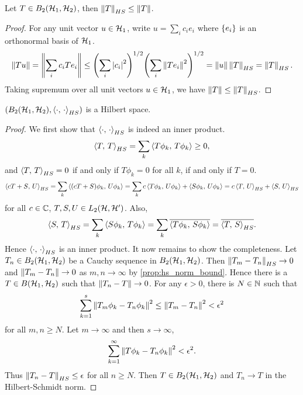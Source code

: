 \begin{proposition}\label{prop:hs_norm_bound}
    Let $T\in B_2(\mathcal{H}_1,\mathcal{H}_2)$, then $\left\lVert {T} \right\rVert_{HS}\leq\left\lVert {T} \right\rVert$. 
\end{proposition}
\begin{proof}
    For any unit vector $u\in\mathcal{H}_1$, write $u = \sum_i c_ie_i$ where 
    $\left\{ {e_i} \right\}$ is an orthonormal basis of $\mathcal{H}_1$. 
    \begin{equation*}
        \norm{Tu} = \norm{\sum_i c_iTe_i} 
        \leq \pth{\sum_i \abs{c_i}^2}^{1/2}\pth{\sum_i \norm{Te_i}^2}^{1/2} 
        = \norm{u}\norm{T}_{HS} = \norm{T}_{HS}.
    \end{equation*}
    Taking supremum over all unit vectors $u\in\mathcal{H}_1$, we have 
    $\left\lVert {T} \right\rVert\leq\left\lVert {T} \right\rVert_{HS}$.
\end{proof}

\begin{proposition}
    $(B_2(\mathcal{H}_1,\mathcal{H}_2), \left\langle {\cdot},\, {\cdot} \right\rangle_{HS})$ is a Hilbert space.
\end{proposition}
\begin{proof}
    We first show that $\left\langle {\cdot},\, {\cdot} \right\rangle_{HS}$ is indeed an inner product. 
    \begin{equation*}
        \left\langle {T},\, {T} \right\rangle_{HS} = \sum_k \left\langle {T\phi_k},\, {T\phi_k} \right\rangle \geq 0, 
    \end{equation*}
    and $\left\langle {T},\, {T} \right\rangle_{HS} = 0$ if and only if $T\phi_k = 0$ for all $k$, 
    if and only if $T = 0$. 
    \begin{equation*}
        \left\langle {cT+S},\, {U} \right\rangle_{HS} = \sum_k \left\langle {(cT+S)\phi_k},\, {U\phi_k} \right\rangle 
        = \sum_k c\left\langle {T\phi_k},\, {U\phi_k} \right\rangle + \left\langle {S\phi_k},\, {U\phi_k} \right\rangle 
        = c\left\langle {T},\, {U} \right\rangle_{HS} + \left\langle {S},\, {U} \right\rangle_{HS}
    \end{equation*}
    for all $c\in\mathbb{C}$, $T,S,U\in L_2(\mathcal{H},\mathcal{H}')$. Also, 
    \begin{equation*}
        \left\langle {S},\, {T} \right\rangle_{HS} = \sum_k \left\langle {S\phi_k},\, {T\phi_k} \right\rangle 
        = \sum_k \overline{\left\langle {T\phi_k},\, {S\phi_k} \right\rangle} 
        = \overline{\left\langle {T},\, {S} \right\rangle_{HS}}.
    \end{equation*}
    Hence $\left\langle {\cdot},\, {\cdot} \right\rangle_{HS}$ is an inner product. It now remains 
    to show the completeness. Let $T_n\in B_2(\mathcal{H}_1,\mathcal{H}_2)$ be a Cauchy 
    sequence in $B_2(\mathcal{H}_1,\mathcal{H}_2)$. Then $\left\lVert {T_m - T_n} \right\rVert_{HS}\to 0$ 
    and $\left\lVert {T_m - T_n} \right\rVert\to 0$ as $m,n\to\infty$ by \cref{prop:hs_norm_bound}. 
    Hence there is a $T\in B(\mathcal{H}_1,\mathcal{H}_2)$ such that $\left\lVert {T_n - T} \right\rVert\to 0$. 
    For any $\epsilon>0$, there is $N\in\mathbb{N}$ such that 
    \begin{equation*}
        \sum_{k=1}^s \left\lVert {T_m\phi_k - T_n\phi_k} \right\rVert^2 
        \leq \left\lVert {T_m - T_n} \right\rVert^2 < \epsilon^2 
    \end{equation*}
    for all $m,n\geq N$. Let $m\to\infty$ and then $s\to\infty$, 
    \begin{equation*}
        \sum_{k=1}^\infty \left\lVert {T\phi_k - T_n\phi_k} \right\rVert^2 <\epsilon^2.
    \end{equation*}
    Thus $\left\lVert {T_n - T} \right\rVert_{HS} \leq \epsilon$ for all $n\geq N$. 
    Then $T\in B_2(\mathcal{H}_1,\mathcal{H}_2)$ and $T_n\to T$ in the Hilbert-Schmidt norm.
\end{proof}


